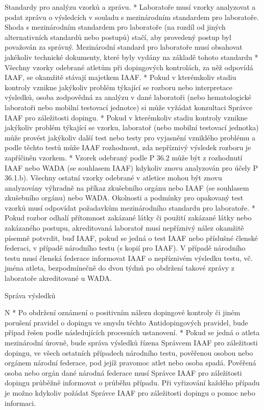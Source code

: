   Standardy pro analýzu vzorků a zprávu.
  * Laboratoře musí vzorky analyzovat a podat zprávu o výsledcích v souladu s mezinárodním standardem pro laboratoře. Shoda s mezinárodním standardem pro laboratoře (na rozdíl od jiných alternativních standardů nebo postupů) stačí, aby provedený postup byl považován za správný. Mezinárodní standard pro laboratoře musí obsahovat jakékoliv technické dokumenty, které byly vydány na základě tohoto standardu
  \enditems
* Všechny vzorky odebrané atletům při dopingových kontrolách, za něž odpovídá IAAF, se okamžitě stávají majetkem IAAF.
* Pokud v kterémkoliv stadiu kontroly vznikne jakýkoliv problém týkající se rozboru nebo interpretace výsledků, osoba zodpovědná za analýzu v dané laboratoři (nebo hematologické laboratoři nebo mobilní testovací jednotce) si může vyžádat konzultaci Správce IAAF pro záležitosti dopingu.
* Pokud v kterémkoliv stadiu kontroly vznikne jakýkoliv problém týkající se vzorku, laboratoř (nebo mobilní testovací jednotka) může provést jakýkoliv další test nebo testy pro vyjasnění vzniklého problému a podle těchto testů může IAAF rozhodnout, zda nepříznivý výsledek rozboru je zapříčiněn vzorkem.
* Vzorek odebraný podle P 36.2 může být z rozhodnutí IAAF nebo WADA (se souhlasem IAAF) kdykoliv znovu analyzován pro účely P 36.1.b). Všechny ostatní vzorky odebrané v atletice mohou být znovu analyzovány výhradně na příkaz zkušebního orgánu nebo IAAF (se souhlasem zkušebního orgánu) nebo WADA. Okolnosti a podmínky pro opakovaný test vzorků musí odpovídat požadavkům mezinárodního standardu pro laboratoře.
* Pokud rozbor odhalí přítomnost zakázané látky či použití zakázané látky nebo zakázaného postupu, akreditovaná laboratoř musí nepříznivý nález okamžitě písemně potvrdit, buď IAAF, pokud se jedná o test IAAF nebo příslušné členské federaci, v případě národního testu (s kopií pro IAAF). V případě národního testu musí členská federace informovat IAAF o nepříznivém výsledku testu, vč. jména atleta, bezpodmínečně do dvou týdnů po obdržení takové zprávy z laboratoře akreditované u WADA.
\enditems

\secc Správa výsledků

\begitems \style N
* Po obdržení oznámení o positivním nálezu dopingové kontroly či jiném porušení pravidel o dopingu ve smyslu těchto Antidopingových pravidel, bude případ řešen podle následujících procesních ustanovení.
* Pokud se jedná o atleta mezinárodní úrovně, bude správa výsledků řízena Správcem IAAF pro záležitosti dopingu, ve všech ostatních případech národního testu, pověřenou osobou nebo orgánem národní federace, pod jejíž pravomoc atlet nebo osoba spadá. Pověřená osoba nebo orgán dané národná federace musí Správce IAAF pro záležitosti dopingu průběžně informovat o průběhu případu. Při vyřizování každého případu je možno kdykoliv požádat Správce IAAF pro záležitosti dopingu o pomoc nebo informaci.

